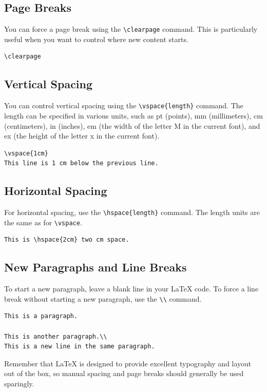 \subsection{Page Breaks}
You can force a page break using the \verb|\clearpage| command. This is particularly useful when you want to control where new content starts.

\begin{verbatim}
\clearpage
\end{verbatim}

\subsection{Vertical Spacing}
You can control vertical spacing using the \verb|\vspace{length}| command. The length can be specified in various units, such as pt (points), mm (millimeters), cm (centimeters), in (inches), em (the width of the letter M in the current font), and ex (the height of the letter x in the current font).

\begin{verbatim}
\vspace{1cm}
This line is 1 cm below the previous line.
\end{verbatim}

\subsection{Horizontal Spacing}
For horizontal spacing, use the \verb|\hspace{length}| command. The length units are the same as for \verb|\vspace|.

\begin{verbatim}
This is \hspace{2cm} two cm space.
\end{verbatim}

\subsection{New Paragraphs and Line Breaks}
To start a new paragraph, leave a blank line in your LaTeX code. To force a line break without starting a new paragraph, use the \verb|\\| command.

\begin{verbatim}
This is a paragraph.

This is another paragraph.\\
This is a new line in the same paragraph.
\end{verbatim}

Remember that LaTeX is designed to provide excellent typography and layout out of the box, so manual spacing and page breaks should generally be used sparingly.

